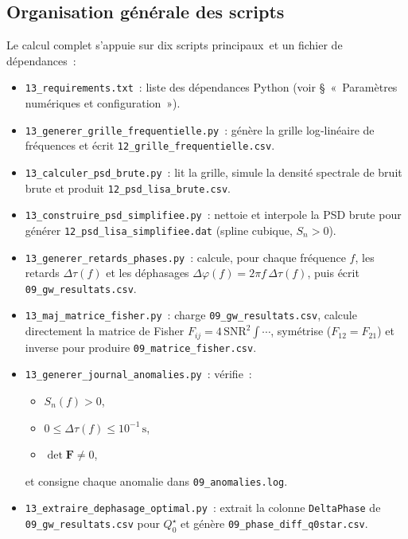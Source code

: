 \subsection{Organisation générale des scripts}
Le calcul complet s’appuie sur dix scripts principaux et un fichier de dépendances :

\begin{itemize}
  \item \texttt{13\_requirements.txt} : liste des dépendances Python (voir § « Paramètres numériques et configuration »).

  \item \texttt{13\_generer\_grille\_frequentielle.py} : génère la grille log‑linéaire de fréquences et écrit \texttt{12\_grille\_frequentielle.csv}.

  \item \texttt{13\_calculer\_psd\_brute.py} : lit la grille, simule la densité spectrale de bruit brute et produit \texttt{12\_psd\_lisa\_brute.csv}.

  \item \texttt{13\_construire\_psd\_simplifiee.py} : nettoie et interpole la PSD brute pour générer \texttt{12\_psd\_lisa\_simplifiee.dat} (spline cubique, $S_n>0$).

  \item \texttt{13\_generer\_retards\_phases.py} : calcule, pour chaque fréquence $f$, les retards $\Delta\tau(f)$ et les déphasages $\Delta\varphi(f)=2\pi f\,\Delta\tau(f)$, puis écrit \texttt{09\_gw\_resultats.csv}.

  \item \texttt{13\_maj\_matrice\_fisher.py} : charge \texttt{09\_gw\_resultats.csv}, calcule directement la matrice de Fisher $F_{ij}=4\,\mathrm{SNR}^2\int\cdots$, symétrise ($F_{12}=F_{21}$) et inverse pour produire \texttt{09\_matrice\_fisher.csv}.

  \item \texttt{13\_generer\_journal\_anomalies.py} : vérifie :
    \begin{itemize}
      \item $S_n(f)>0$,
      \item $0 \le \Delta\tau(f)\le10^{-1}\,\mathrm{s}$,
      \item $\det\mathbf{F}\neq0$,
    \end{itemize}
    et consigne chaque anomalie dans \texttt{09\_anomalies.log}.

  \item \texttt{13\_extraire\_dephasage\_optimal.py} : extrait la colonne \texttt{DeltaPhase} de \texttt{09\_gw\_resultats.csv} pour $Q_{0}^{\star}$ et génère \texttt{09\_phase\_diff\_q0star.csv}.


\end{itemize}
